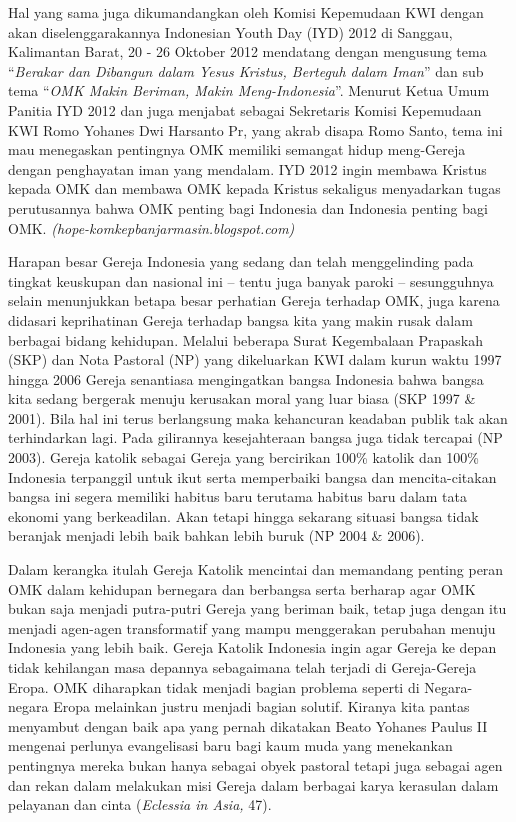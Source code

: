       Hal yang sama juga dikumandangkan oleh Komisi Kepemudaan KWI dengan akan diselenggarakannya Indonesian Youth Day (IYD) 2012 di Sanggau, Kalimantan Barat, 20 - 26 Oktober 2012 mendatang dengan mengusung tema “\textit{Berakar dan Dibangun dalam Yesus Kristus, Berteguh dalam Iman}” dan sub tema “\textit{OMK Makin Beriman, Makin Meng-Indonesia}”. Menurut  Ketua Umum Panitia IYD 2012 dan juga menjabat sebagai Sekretaris Komisi Kepemudaan KWI Romo Yohanes Dwi Harsanto Pr, yang akrab disapa Romo Santo, tema ini mau menegaskan pentingnya OMK memiliki semangat hidup meng-Gereja dengan penghayatan iman yang mendalam. IYD 2012 ingin membawa Kristus kepada OMK dan membawa OMK kepada Kristus sekaligus menyadarkan tugas perutusannya bahwa OMK penting bagi Indonesia dan Indonesia penting bagi OMK.  
\small\textit{(hope-komkepbanjarmasin.blogspot.com)}\normalsize
 
        Harapan besar Gereja Indonesia yang sedang dan telah menggelinding pada tingkat keuskupan dan nasional ini – tentu juga banyak paroki – sesungguhnya selain menunjukkan betapa besar perhatian Gereja terhadap OMK, juga karena  didasari keprihatinan Gereja terhadap bangsa kita yang makin rusak dalam berbagai bidang kehidupan. Melalui beberapa Surat Kegembalaan Prapaskah (SKP) dan Nota Pastoral (NP)  yang dikeluarkan KWI dalam kurun waktu 1997 hingga 2006 Gereja senantiasa mengingatkan  bangsa Indonesia bahwa  bangsa kita sedang bergerak menuju kerusakan moral yang luar biasa (SKP 1997 \& 2001). Bila hal ini terus berlangsung maka kehancuran keadaban publik tak akan terhindarkan lagi. Pada gilirannya kesejahteraan bangsa juga tidak tercapai (NP 2003). Gereja katolik sebagai Gereja yang bercirikan 100\% katolik dan 100\% Indonesia terpanggil untuk ikut serta memperbaiki bangsa dan  mencita-citakan bangsa ini segera memiliki habitus baru terutama habitus baru dalam tata ekonomi yang berkeadilan. Akan tetapi hingga sekarang situasi bangsa tidak beranjak menjadi lebih baik bahkan lebih buruk (NP 2004 \& 2006).
 
       Dalam kerangka itulah Gereja Katolik mencintai dan memandang penting peran OMK dalam    kehidupan bernegara dan berbangsa serta berharap agar OMK bukan saja menjadi putra-putri Gereja yang beriman baik, tetap juga dengan itu menjadi agen-agen transformatif yang mampu menggerakan perubahan menuju Indonesia yang lebih baik. Gereja Katolik Indonesia ingin agar Gereja ke depan  tidak kehilangan masa depannya sebagaimana telah terjadi di Gereja-Gereja Eropa.  OMK  diharapkan tidak  menjadi bagian problema seperti di Negara-negara Eropa melainkan justru menjadi bagian solutif. Kiranya kita pantas menyambut dengan baik apa yang pernah dikatakan Beato Yohanes Paulus II mengenai perlunya evangelisasi baru bagi kaum muda yang menekankan pentingnya mereka bukan hanya sebagai obyek pastoral tetapi juga sebagai  agen dan rekan dalam melakukan misi Gereja dalam berbagai karya kerasulan dalam pelayanan dan cinta (\textit{Eclessia in Asia,} 47).
 
